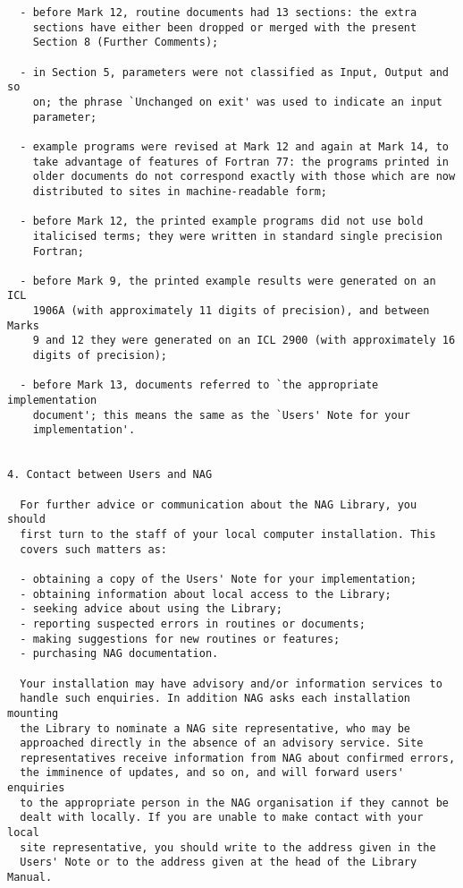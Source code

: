 \begin{verbatim}
  - before Mark 12, routine documents had 13 sections: the extra
    sections have either been dropped or merged with the present
    Section 8 (Further Comments);
 
  - in Section 5, parameters were not classified as Input, Output and so
    on; the phrase `Unchanged on exit' was used to indicate an input
    parameter;
 
  - example programs were revised at Mark 12 and again at Mark 14, to
    take advantage of features of Fortran 77: the programs printed in
    older documents do not correspond exactly with those which are now
    distributed to sites in machine-readable form;
 
  - before Mark 12, the printed example programs did not use bold
    italicised terms; they were written in standard single precision
    Fortran;
 
  - before Mark 9, the printed example results were generated on an ICL
    1906A (with approximately 11 digits of precision), and between Marks
    9 and 12 they were generated on an ICL 2900 (with approximately 16
    digits of precision);
 
  - before Mark 13, documents referred to `the appropriate implementation
    document'; this means the same as the `Users' Note for your
    implementation'.
 
 
4. Contact between Users and NAG
 
  For further advice or communication about the NAG Library, you should
  first turn to the staff of your local computer installation. This
  covers such matters as:
 
  - obtaining a copy of the Users' Note for your implementation;
  - obtaining information about local access to the Library;
  - seeking advice about using the Library;
  - reporting suspected errors in routines or documents;
  - making suggestions for new routines or features;
  - purchasing NAG documentation.
 
  Your installation may have advisory and/or information services to
  handle such enquiries. In addition NAG asks each installation mounting
  the Library to nominate a NAG site representative, who may be
  approached directly in the absence of an advisory service. Site
  representatives receive information from NAG about confirmed errors,
  the imminence of updates, and so on, and will forward users' enquiries
  to the appropriate person in the NAG organisation if they cannot be
  dealt with locally. If you are unable to make contact with your local
  site representative, you should write to the address given in the
  Users' Note or to the address given at the head of the Library Manual.
\end{verbatim}
